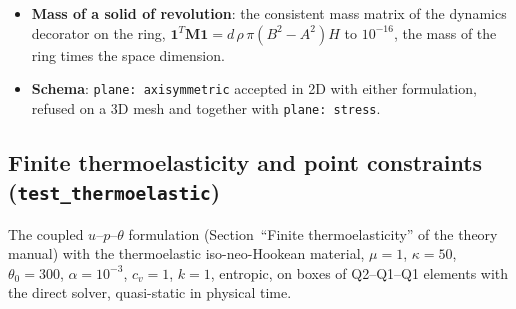 \documentclass[11pt]{article}
\DeclareRobustCommand{\code}[1]{{\def\_{\textunderscore\allowbreak}\texttt{#1}}}
\begin{document}
\begin{itemize}[nosep]
    outer wall and a rigid sphere pressing on the top face, at a perturbed
    state; $\bm J\bm v$ against central differences of the residual to
    $10^{-9}$ (the hoop seeds of the material tangent, of the follower face
    and of the contact face).
  \item \textbf{Mass of a solid of revolution}: the consistent mass matrix of
    the dynamics decorator on the ring, $\bm 1^T\bm M\bm 1 = d\,\rho\,\pi(B^2 - A^2)H$
    to $10^{-16}$, the mass of the ring times the space dimension.
  \item \textbf{Schema}: \code{plane: axisymmetric} accepted in 2D with either
    formulation, refused on a 3D mesh and together with \code{plane: stress}.
\end{itemize}

\subsection{Finite thermoelasticity and point constraints (\texttt{test\_thermoelastic})}
\label{sec:testthermo}
The coupled $u$--$p$--$\theta$ formulation (Section~``Finite
thermoelasticity'' of the theory manual) with the thermoelastic
iso-neo-Hookean material, $\mu = 1$, $\kappa = 50$, $\theta_0 = 300$,
$\alpha = 10^{-3}$, $c_v = 1$, $k = 1$, entropic, on boxes of Q2--Q1--Q1
elements with the direct solver, quasi-static in physical time.
\end{document}

